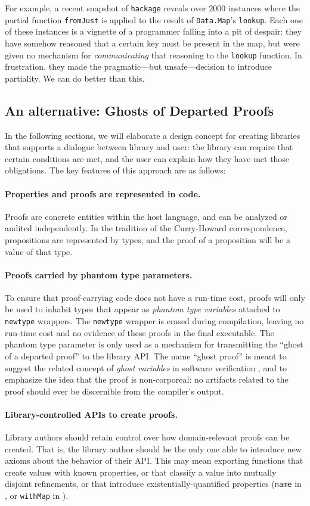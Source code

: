 \documentclass[format=sigplan, review=false, screen=true]{acmart}
\begin{document}
For example, a recent snapshot of \texttt{hackage}
reveals over 2000 instances where the partial function
\texttt{fromJust} is applied to the
result of \texttt{Data.Map}'s \texttt{lookup}. Each one
of these instances is a vignette of a programmer
falling into a pit of despair:
they have somehow reasoned that a certain key must be
present in the map, but were given no mechanism for
\emph{communicating} that reasoning to the
\texttt{lookup} function. In frustration, they made the
pragmatic---but unsafe---decision to introduce partiality.
We can do better than this.

\subsection{An alternative: Ghosts of Departed Proofs}
In the following sections, we will elaborate a design concept for
creating libraries that supports a dialogue between
 library and  user: the library can require that certain conditions
are met, and the user can explain how they have met those obligations.
The key features of this approach are as follows:
\paragraph{Properties and proofs are represented in code.}
  Proofs are concrete entities within the host language, and can
  be analyzed or audited independently. In the tradition of
  the Curry-Howard correspondence, propositions are represented
  by types, and the proof of a proposition will be a value of that type.
\paragraph{Proofs carried by phantom type parameters.}
  To ensure that proof-carrying code does not have a run-time cost, proofs will only
  be used to inhabit types that appear as \emph{phantom type variables} attached to
  \texttt{newtype} wrappers.
  The \texttt{newtype} wrapper is erased during compilation, leaving no run-time cost and
  no evidence of these proofs in the final executable.
  The phantom type parameter is only used as a mechanism for transmitting the
  ``ghost of a departed proof'' to the library API.
  The name ``ghost proof'' is meant to suggest the related concept of \emph{ghost variables} in software
  verification \cite{leavens1999jml}, and to emphasize the idea that the proof is non-corporeal: no
  artifacts related to the proof should ever be discernible from the compiler's output.
\paragraph{Library-controlled APIs to create proofs.}
  Library authors should retain control over how domain-relevant proofs can be created.
  That is, the library author should be the only one able to introduce new axioms about
  the behavior of their API.
  This may mean exporting functions that create values with known properties, or that
  classify a value into mutually disjoint refinements,
or that introduce existentially-quantified properties (\texttt{name} in , or \texttt{withMap}
in ).
\end{document}
